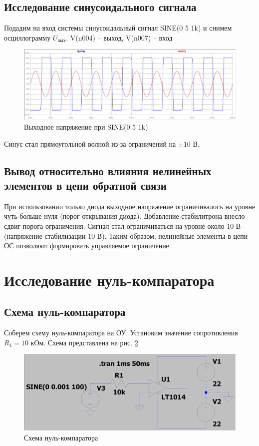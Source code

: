 \documentclass[a4paper, 12pt]{article}
\begin{document}
    \subsection{Исследование синусоидального сигнала}
    Подадим на вход системы синусоидальный сигнал SINE(0 5 1k) и снимем осциллограмму $U_\text{вых}$.
    V(n004) -- выход, V(n007) -- вход
    \begin{figure}[H]
        \centering
        \includegraphics[scale=0.46]{0task_sine.png}
        \captionsetup{skip=0pt}
        \caption{Выходное напряжение при SINE(0 5 1k)}
        \label{fig:0task_sine}
    \end{figure}
    \noindent Синус стал прямоугольной волной из-за ограничений на $\pm10$ В.


    \subsection{Вывод относительно влияния нелинейных элементов в цепи обратной связи}
    При использовании только диода выходное напряжение ограничивалось на уровне чуть больше нуля
    (порог открывания диода). Добавление стабилитрона внесло сдвиг порога ограничения. Сигнал
    стал ограничиваться на уровне около 10 В (напряжение стабилизации 10 В). Таким образом,
    нелинейные элементы в цепи ОС позволяют формировать управляемое ограничение.


    \section{Исследование нуль-компаратора}
    \subsection{Схема нуль-компаратора}
    Соберем схему нуль-компаратора на ОУ. Установим
    значение сопротивления $R_1=10$ кОм. Схема
    представлена на рис. \ref{fig:scheme5}
    \begin{figure}[H]
        \centering
        \includegraphics[scale=0.22]{scheme5.png}
        \captionsetup{skip=0pt}
        \caption{Схема нуль-компаратора}
        \label{fig:scheme5}
    \end{figure}
\end{document}
